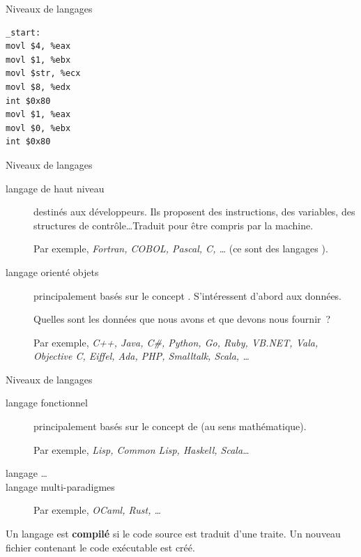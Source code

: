 \begin{hideedit}
\begin{frame}[fragile]{Niveaux de langages}
\begin{description}
{\begin{verbatim}
_start:
movl $4, %eax
movl $1, %ebx
movl $str, %ecx
movl $8, %edx
int $0x80
movl $1, %eax
movl $0, %ebx
int $0x80
\end{verbatim}
}
  \end{description}
\end{frame}
\begin{frame}[fragile]{Niveaux de langages}
  \begin{description}
    \item[langage de haut niveau]
      destinés aux développeurs. Ils proposent des instructions, des variables,
      des structures de contrôle\dots Traduit pour être compris par la machine.

      Par exemple, \textit{Fortran, COBOL, Pascal, C, \dots} (ce sont des
      langages ).

    \item[langage orienté objets]
      principalement basés sur le concept . S'intéressent
      d'abord aux données.

      Quelles sont les données que nous avons et que devons nous fournir~?

      Par exemple, {\it C++, Java, C\#, Python, Go, Ruby, VB.NET, Vala,}
      \textit{Objective C, Eiffel, Ada, PHP, Smalltalk, Scala, \dots}
  \end{description}
\end{frame}
\begin{frame}[fragile]{Niveaux de langages}
  \begin{description}
    \item[langage fonctionnel]
      principalement basés sur le concept de  (au sens
      mathématique).

      Par exemple, \textit{Lisp, Common Lisp, Haskell, Scala\dots}

    \item[langage \dots]

    \item[langage multi-paradigmes]
      Par exemple, \textit{OCaml, Rust, \dots}
  \end{description}
\end{frame}

\begin{frame}
  \begin{definition}
    Un langage est \textbf{compilé} si le code source est traduit d'une
    traite. Un nouveau fichier contenant le code exécutable est créé.
  \end{definition}


\end{frame}
\end{hideedit}
